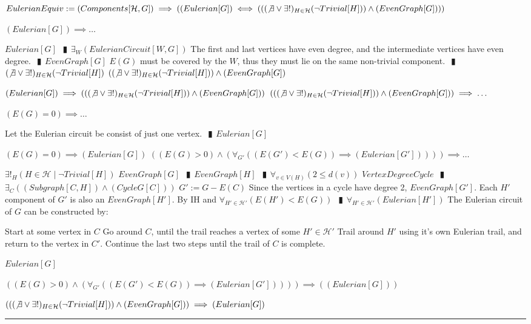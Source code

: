 \documentclass{book}
\newcommand{\abr}{:=}
\newcommand{\pipe}{$\phantom{(}\vrectangleblack\phantom{)}$}
\newcommand{\st}{\mathbin{|}}
\begin{document}
$EulerianEquiv \abr (Components[\mathcal{H}, G]) \implies ((Eulerian[G]) \iff (((\not \exists \lor \exists!)_{H \in \mathcal{H}}(\lnot Trivial[H])) \land (EvenGraph[G])))$
\begin{enumerate}
  \lit $(Eulerian[G]) \implies \ldots$
  \begin{enumerate}
    \lit $Eulerian[G]$ \pipe $\exists_{W}(EulerianCircuit[W, G])$
    \lit The first and last vertices have even degree, and the intermediate vertices have even degree. \pipe $EvenGraph[G]$
    \lit $E(G)$ must be covered by the $W$, thus they must lie on the same non-trivial component. \pipe $(\not \exists \lor \exists!)_{H \in \mathcal{H}}(\lnot Trivial[H])$
    \lit $((\not \exists \lor \exists!)_{H \in \mathcal{H}}(\lnot Trivial[H])) \land (EvenGraph[G])$
  \end{enumerate}
  \lit $(Eulerian[G]) \implies (((\not \exists \lor \exists!)_{H \in \mathcal{H}}(\lnot Trivial[H])) \land (EvenGraph[G]))$
  \lit $(((\not \exists \lor \exists!)_{H \in \mathcal{H}}(\lnot Trivial[H])) \land (EvenGraph[G])) \implies \ldots$
  \begin{enumerate}
    \lit $(E(G) = 0) \implies \ldots$
    \begin{enumerate}
      \lit Let the Eulerian circuit be consist of just one vertex. \pipe $Eulerian[G]$
    \end{enumerate}
    \lit $(E(G) = 0) \implies (Eulerian[G])$
    \lit $((E(G) > 0) \land (\forall_{G'}((E(G') < E(G)) \implies (Eulerian[G'])))) \implies \ldots$
    \begin{enumerate}
      \lit $\exists!_{H}(H \in \mathcal{H} \st \lnot Trivial[H])$
      \lit $EvenGraph[G]$ \pipe $EvenGraph[H]$ \pipe $\forall_{v \in V(H)}(2 \leq d(v))$
      \lit $VertexDegreeCycle$ \pipe $\exists_{C}((Subgraph[C, H]) \land (CycleG[C]))$
      \lit $G' \abr G - E(C)$
      \lit Since the vertices in a cycle have degree 2, $EvenGraph[G']$. Each $H'$ component of $G'$ is also an $EvenGraph[H']$.
      \lit By IH and $\forall_{H' \in \mathcal{H}'}(E(H') < E(G))$ \pipe $\forall_{H' \in \mathcal{H}'}(Eulerian[H'])$
      \lit The Eulerian circuit of $G$ can be constructed by:
      \begin{enumerate}
        \lit Start at some vertex in $C$
        \lit Go around $C$, until the trail reaches a vertex of some $H' \in \mathcal{H}'$
        \lit Trail around $H'$ using it's own Eulerian trail, and return to the vertex in $C'$.
        \lit Continue the last two steps until the trail of $C$ is complete.
      \end{enumerate}
      \lit $Eulerian[G]$
    \end{enumerate}
    \lit $((E(G) > 0) \land (\forall_{G'}((E(G') < E(G)) \implies (Eulerian[G'])))) \implies ((Eulerian[G]))$
  \end{enumerate}
  \lit $(((\not \exists \lor \exists!)_{H \in \mathcal{H}}(\lnot Trivial[H])) \land (EvenGraph[G])) \implies (Eulerian[G])$
\end{enumerate} \vspace{.75mm} \hrule \vspace{.75mm} \ \\
\end{document}

